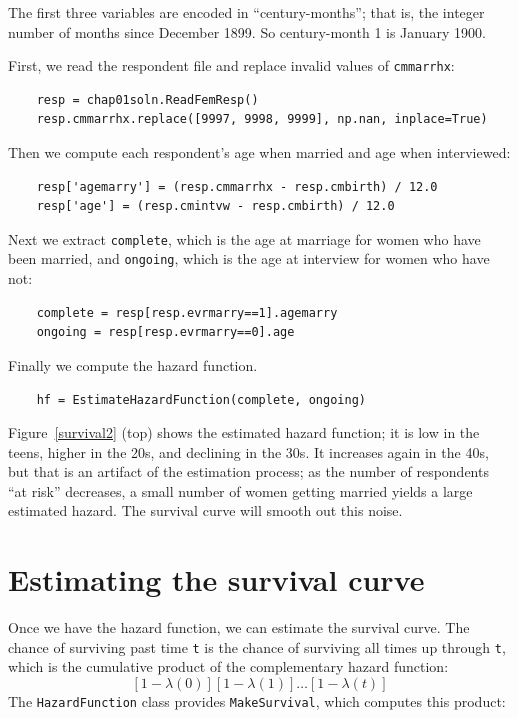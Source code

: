 \documentclass[12pt]{book}
\begin{document}
The first three variables are encoded in ``century-months''; that is, the
integer number of months since December 1899.  So century-month
1 is January 1900.

First, we read the respondent file and replace invalid values of
{\tt cmmarrhx}:

\begin{verbatim}
    resp = chap01soln.ReadFemResp()
    resp.cmmarrhx.replace([9997, 9998, 9999], np.nan, inplace=True)
\end{verbatim}

Then we compute each respondent's age when married and age when
interviewed:

\begin{verbatim}
    resp['agemarry'] = (resp.cmmarrhx - resp.cmbirth) / 12.0
    resp['age'] = (resp.cmintvw - resp.cmbirth) / 12.0
\end{verbatim}

Next we extract {\tt complete}, which is the age at marriage for
women who have been married, and {\tt ongoing}, which is the
age at interview for women who have not:

\begin{verbatim}
    complete = resp[resp.evrmarry==1].agemarry
    ongoing = resp[resp.evrmarry==0].age
\end{verbatim}

Finally we compute the
hazard function.

\begin{verbatim}
    hf = EstimateHazardFunction(complete, ongoing)
\end{verbatim}

Figure~\ref{survival2} (top) shows the estimated hazard function;
it is low in the teens,
higher in the 20s, and declining in the 30s.  It increases again in
the 40s, but that is an artifact of the estimation process; as the
number of respondents ``at risk'' decreases, a small number of
women getting married yields a large estimated hazard.  The survival
curve will smooth out this noise.


\section{Estimating the survival curve}

Once we have the hazard function, we can estimate the survival curve.
The chance of surviving past time {\tt t} is the chance of surviving
all times up through {\tt t}, which is the cumulative product of
the complementary hazard function:
%
\[ [1-\lambda(0)] [1-\lambda(1)] \ldots [1-\lambda(t)] \]
%
The {\tt HazardFunction} class provides {\tt MakeSurvival}, which
computes this product:
\end{document}
